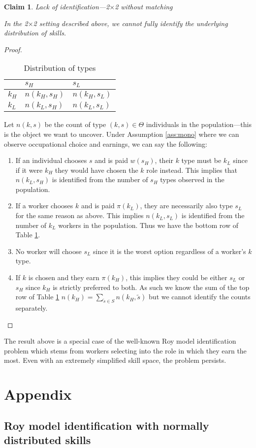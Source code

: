 \documentclass[12 pt]{article}
\newtheorem{claim}{Claim}
\begin{document}
\begin{claim}{Lack of identification---2$\times$2 without matching}
	
	In the 2$\times$2 setting described above, we cannot fully identify the underlying distribution of skills.
\end{claim}
\begin{proof}
\begin{table}[H]
	\centering
	\begin{tabular}{l|ll}
		& $s_H$        & $s_L$        \\ \hline
		$k_H$ & $n(k_H,s_H)$ & $n(k_H,s_L)$ \\
		$k_L$ & $n(k_L,s_H)$ & $n(k_L,s_L)$
		
	\end{tabular}
	\caption{Distribution of types}
	\label{tab:2by2counts}
\end{table}
Let $n(k,s)$ be the count of type $(k,s)\in \Theta$ individuals in the population---this is the object we want to uncover. Under Assumption \ref{ass:mono} where we can observe occupational choice and earnings, we can say the following:
\begin{enumerate}
	\item If an individual chooses $s$ and is paid $w(s_H)$, their $k$ type must be $k_L$ since if it were $k_H$ they would have chosen the $k$ role instead. This implies that $n(k_L,s_H)$ is identified from the number of $s_H$ types observed in the population.
	\item If a worker chooses $k$ and is paid $\pi(k_L)$, they are necessarily also type $s_L$ for the same reason as above. This implies $n(k_L,s_L)$ is identified from the number of $k_L$ workers in the population. Thus we have the bottom row of Table \ref{tab:2by2counts}.
	\item No worker will choose $s_L$ since it is the worst option regardless of a worker's $k$ type.
	\item If $k$ is chosen and they earn $\pi(k_H)$, this implies they could be either $s_L$ or $s_H$ since $k_H$ is strictly preferred to both. As such we know the sum of the top row of Table \ref{tab:2by2counts} $n(k_H)=\sum_{\tilde{s}\in S}n(k_H,\tilde{s})$ but we cannot identify the counts separately.
\end{enumerate}
\end{proof}
The result above is a special case of the well-known Roy model identification problem which stems from workers selecting into the role in which they earn the most. Even with an extremely simplified skill space, the problem persists.
\newpage



\newpage
\setcounter{section}{0}
\renewcommand{\thesection}{\Alph{section}}
\section{Appendix}
\subsection{Roy model identification with normally distributed skills}
\end{document}
